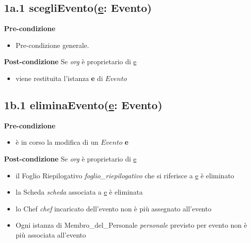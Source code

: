 \documentclass[12pt]{extarticle}
\begin{document}
\subsection*{1a.1 scegliEvento(\underline{e}: Evento)}
\textbf{Pre-condizione}
\begin{itemize}
  \item Pre-condizione generale.
\end{itemize}
\textbf{Post-condizione} Se \textit{org} è proprietario di \underline{e} 
\begin{itemize}
   \item viene restituita l'istanza \textbf{e} di $Evento$
\end{itemize}


\subsection*{1b.1 eliminaEvento(\underline{e}: Evento)}

\textbf{Pre-condizione}
\begin{itemize}
  \item è in corso la modifica di un $Evento$ \textbf{e}
\end{itemize}
\textbf{Post-condizione} Se \textit{org} è proprietario di \underline{e} 
\begin{itemize}
  \item il Foglio Riepilogativo \textit{foglio\_riepilogativo} che si riferisce a \underline{e}  è eliminato
  \item la Scheda \textit{scheda} associata a \underline{e}  è eliminata
  \item lo Chef \textit{chef} incaricato dell'evento non è più assegnato all'evento
  \item Ogni istanza di Membro\_del\_Personale \textit{personale} previsto per evento non è più associata all'evento
\end{itemize}
\end{document}
